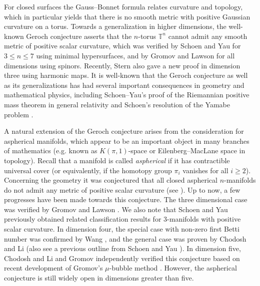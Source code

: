 \documentclass[11pt,letterpaper]{amsart}
\numberwithin{equation}{section}
\theoremstyle{definition}
\begin{document}
For closed surfaces the Gauss--Bonnet formula relates curvature and topology, which in particular yields that there is no smooth metric with positive Gaussian curvature on a torus.
Towards a generalization in higher dimensions,
the well-known Geroch conjecture asserts that the $n$-torus $\mathbb{T}^{n}$  cannot admit any smooth metric of positive scalar curvature, which was verified by Schoen and Yau \cite{SY79a} for $3\leq n\leq 7$ using minimal hypersurfaces, and by Gromov and Lawson \cite{GL80a} for all dimensions using spinors. Recently, Stern \cite{Ste22} also gave a new proof in dimension three using harmonic maps. It is well-known that the Geroch conjecture as well as its generalizations has had several important consequences in geometry and mathematical physics, including Schoen--Yau's proof of the Riemannian positive mass theorem in general relativity \cite{SY79b,Sch89,SY22} and Schoen's resolution of the Yamabe problem \cite{Sch84}.

A natural extension of the Geroch conjecture arises from the consideration for aspherical manifolds, which appear to be an important object in many branches of mathematics (e.g. known as $K(\pi,1)$-space or Eilenberg--MacLane space in topology). Recall that a manifold is called \emph{aspherical} if it has contractible universal cover (or equivalently, if the homotopy group $\pi_i$ vanishes for all $i\geq 2$). Concerning the geometry it was conjectured that all closed aspherical $n$-manifolds do not admit any metric of positive scalar curvature (see \cite{SY87,Gro86}). Up to now, a few progresses have been made towards this conjecture. The three dimensional case was verified by Gromov and Lawson \cite{GL83}. We also note that Schoen and Yau \cite{SY79c} previously obtained related classification results for 3-manifolds with positive scalar curvature.
In dimension four, the special case with non-zero first Betti number was confirmed by Wang \cite{Wang19}, and the general case was proven by Chodosh and Li \cite{CL20} (also see a previous outline from Schoen and Yau \cite{SY87}). In dimension five,  Chodosh and Li \cite{CL20} and Gromov \cite{Gro20} independently verified this conjecture based on recent development of Gromov's $\mu$-bubble method \cite{Gro19}. However, the aspherical conjecture is still widely open in dimensions greater than five.
\end{document}
